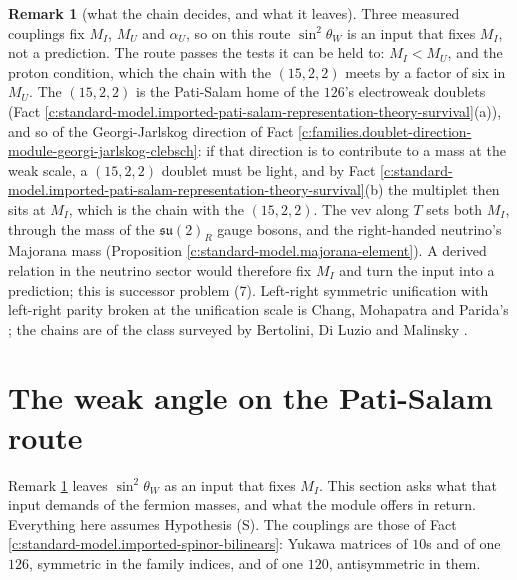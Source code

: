 \documentclass[11pt]{article}
\theoremstyle{definition}
\newtheorem{remark}[theorem]{Remark}
\theoremstyle{plain}
\providecommand{\su}{}\renewcommand{\su}{\mathfrak{su}}
\begin{document}
\begin{remark}[what the chain decides, and what it leaves]\label{c:note.standard-model.what-chain-decides-what-it-leaves}
Three measured couplings fix $M_{I}$, $M_{U}$ and $\alpha_{U}$, so on this route $\sin^{2}\theta_{W}$ is an input that fixes $M_{I}$, not a prediction. The route passes the tests it can be held to: $M_{I} < M_{U}$, and the proton condition, which the chain with the $(15,2,2)$ meets by a factor of six in $M_{U}$. The $(15,2,2)$ is the Pati-Salam home of the $126$'s electroweak doublets (Fact \ref{c:standard-model.imported-pati-salam-representation-theory-survival}(a)), and so of the Georgi-Jarlskog direction of Fact \ref{c:families.doublet-direction-module-georgi-jarlskog-clebsch}: if that direction is to contribute to a mass at the weak scale, a $(15,2,2)$ doublet must be light, and by Fact \ref{c:standard-model.imported-pati-salam-representation-theory-survival}(b) the multiplet then sits at $M_{I}$, which is the chain with the $(15,2,2)$. The vev along $T$ sets both $M_{I}$, through the mass of the $\su(2)_{R}$ gauge bosons, and the right-handed neutrino's Majorana mass (Proposition \ref{c:standard-model.majorana-element}). A derived relation in the neutrino sector would therefore fix $M_{I}$ and turn the input into a prediction; this is successor problem (7). Left-right symmetric unification with left-right parity broken at the unification scale is Chang, Mohapatra and Parida's \cite{ChangMohapatraParida1984}; the chains are of the class surveyed by Bertolini, Di Luzio and Malinsky \cite{BertoliniDiLuzioMalinsky2009}.
\end{remark}

\section{The weak angle on the Pati-Salam route}

\label{c:note.standard-model.setting-weak-angle-pati-salam-route}
Remark \ref{c:note.standard-model.what-chain-decides-what-it-leaves} leaves $\sin^{2}\theta_{W}$ as an input that fixes $M_{I}$. This section asks what that input demands of the fermion masses, and what the module offers in return. Everything here assumes Hypothesis (S). The couplings are those of Fact \ref{c:standard-model.imported-spinor-bilinears}: Yukawa matrices of $10$s and of one $126$, symmetric in the family indices, and of one $120$, antisymmetric in them.
\end{document}
